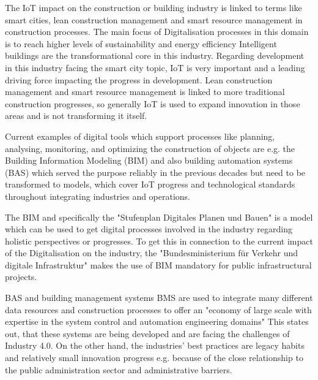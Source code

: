 The \ac{IoT} impact on the construction or building industry is linked to terms like smart cities, lean construction management and smart resource management in construction processes. The main focus of Digitalisation processes in this domain is to reach higher levels of sustainability and energy efficiency %
Intelligent buildings are the transformational core in this industry. Regarding development in this industry facing the smart city topic, \ac{IoT} is very important and a leading driving force impacting the progress in development. Lean construction management and smart resource management is linked to more traditional construction progresses, so generally \ac{IoT} is used to expand innovation in those areas and is not transforming it itself.

Current examples of digital tools which support processes like planning, analysing, monitoring, and optimizing the construction of objects are e.g. the Building Information Modeling (\ac{BIM}) and also building automation systems (\ac{BAS}) which served the purpose reliably in the previous decades but need to be transformed to models, which cover \ac{IoT} progress and technological standards throughout integrating industries and operations. %

The \ac{BIM} and specifically the "Stufenplan Digitales Planen und Bauen" %
is a model which can be used to get digital processes involved in the industry regarding holistic perspectives or progresses. To get this in connection to the current impact of the Digitalisation on the industry, the "Bundesministerium für Verkehr und digitale Infrastruktur" makes the use of BIM mandatory for public infrastructural projects. %

\ac{BAS} and building management systems \ac{BMS} are used to integrate many different data resources and construction processes to offer an "economy of large scale with expertise in the system control and automation engineering domains" %
This states out, that these systems are being developed and are facing the challenges of Industry 4.0. On the other hand, the industries' best practices are legacy habits and relatively small innovation progress e.g. because of the close relationship to the public administration sector and administrative barriers.

